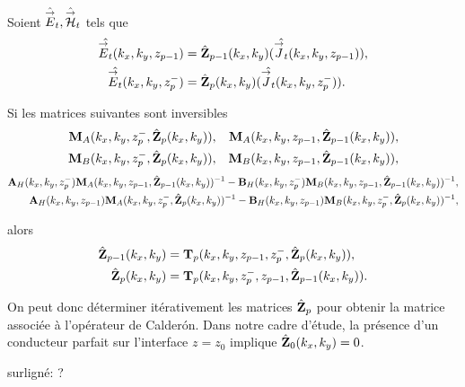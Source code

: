     \begin{prop}%
      \label{prop:plan:synthese:impedance}{}~

      Soient \(\hat{{\overset{\rightarrow}{E}}}_t,\hat{{\overset{\rightarrow}{\mathcal{H}}}}_t\) tels que 
      \begin{align*}
      \hat{{\overset{\rightarrow}{E}}_t}(k_x,k_y,z_{p-1}) &= \hat{\mathbf{Z}}_{p-1}(k_x,k_y)(\hat{{\overset{\rightarrow}{J}}_t}(k_x,k_y,z_{p-1})),
      \\
      \hat{{\overset{\rightarrow}{E}}_t}(k_x,k_y,z_p^-) &= \hat{\mathbf{Z}}_{p}(k_x,k_y)(\hat{{\overset{\rightarrow}{J}}_t}(k_x,k_y,z_p^-)).
      \end{align*}

      Si les matrices suivantes sont inversibles
      \begin{align*}
        \mathbf{M}_{A}(k_x,k_y,z_p^-,\hat{\mathbf{Z}}_{p}(k_x,k_y)), && \mathbf{M}_{A}(k_x,k_y,z_{p-1},\hat{\mathbf{Z}}_{p-1}(k_x,k_y)),
        \\
        \mathbf{M}_{B}(k_x,k_y,z_p^-,\hat{\mathbf{Z}}_{p}(k_x,k_y)), && \mathbf{M}_{B}(k_x,k_y,z_{p-1},\hat{\mathbf{Z}}_{p-1}(k_x,k_y)),
      \end{align*}
      \begin{align*}
        \mathbf{A}_{H}(k_x,k_y,z_p^-)\mathbf{M}_{A}(k_x,k_y,z_{p-1},\hat{\mathbf{Z}}_{p-1}(k_x,k_y))^{-1} - \mathbf{B}_{H}(k_x,k_y,z_p^-)\mathbf{M}_{B}(k_x,k_y,z_{p-1},\hat{\mathbf{Z}}_{p-1}(k_x,k_y))^{-1},
        \\
        \mathbf{A}_{H}(k_x,k_y,z_{p-1})\mathbf{M}_{A}(k_x,k_y,z_p^-,\hat{\mathbf{Z}}_{p}(k_x,k_y))^{-1} - \mathbf{B}_{H}(k_x,k_y,z_{p-1})\mathbf{M}_{B}(k_x,k_y,z_p^-,\hat{\mathbf{Z}}_{p}(k_x,k_y))^{-1},
      \end{align*}

      alors 
      \begin{align*}
        \hat{\mathbf{Z}}_{p-1}(k_x,k_y) &= \mathbf{T}_p(k_x,k_y,z_{p-1},z_p^-,\hat{\mathbf{Z}}_{p}(k_x,k_y)),
        \\
        \hat{\mathbf{Z}}_{p}(k_x,k_y) &= \mathbf{T}_p(k_x,k_y,z_p^-,z_{p-1},\hat{\mathbf{Z}}_{p-1}(k_x,k_y)).
      \end{align*}

    \end{prop}

    On peut donc déterminer itérativement les matrices \(\hat{\mathbf{Z}}_{p}\) pour obtenir la matrice associée à l'opérateur de Calderón.
    Dans notre cadre d'étude, la présence d'un conducteur parfait sur l'interface \(z= z_0\) implique \(\hat{\mathbf{Z}}_{0}(k_x,k_y) = 0\).
\begin{REM}
  surligné: ?
\end{REM}

